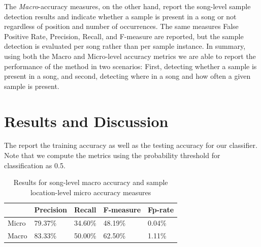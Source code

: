 \documentclass{article}
\begin{document}
The \textit{Macro}-accuracy measures, on the other hand, report the song-level sample detection results and indicate whether a sample is present in a song or not regardless of position and number of occurrences. The same measures False Positive Rate, Precision, Recall, and F-measure are reported, but the sample detection is evaluated per song rather than per sample instance.
In summary, using both the Macro and Micro-level accuracy metrics we are able to report the performance of the method in two scenarios: First, detecting whether a sample is present in a song, and second, detecting where in a song and how often a given sample is present.

\section{Results and Discussion}
The  report the training accuracy as well as the testing accuracy for our classifier. Note that we compute the metrics using the probability threshold for classification as 0.5.

\begin{table}[t]
\centering
\begin{tabular}{|l|l|l|l|l|} \hline
      & Precision & Recall  & F-measure & Fp-rate \\ \hline
Micro & 79.37\%   & 34.60\% & 48.19\%   & 0.04\%  \\ \hline
Macro & 83.33\%   & 50.00\% & 62.50\%   & 1.11\% 	\\ \hline
\end{tabular}
\caption{Results for song-level macro accuracy and sample location-level micro accuracy measures}
\label{results}
\end{table}
\end{document}
